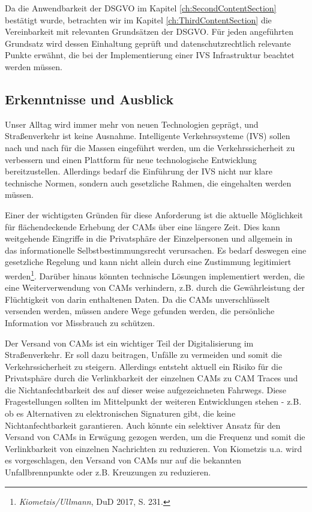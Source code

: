 Da die Anwendbarkeit der DSGVO im Kapitel \ref{ch:SecondContentSection} bestätigt wurde, betrachten wir im Kapitel \ref{ch:ThirdContentSection} die Vereinbarkeit mit relevanten Grundsätzen der DSGVO. Für jeden angeführten Grundsatz wird dessen Einhaltung geprüft und datenschutzrechtlich relevante Punkte erwähnt, die bei der Implementierung einer IVS Infrastruktur beachtet werden müssen.


\subsection{Erkenntnisse und Ausblick}

Unser Alltag wird immer mehr von neuen Technologien geprägt, und Straßenverkehr ist keine Ausnahme. Intelligente Verkehrssysteme (IVS) sollen nach und nach für die Massen eingeführt werden, um die Verkehrssicherheit zu verbessern und einen Plattform für neue technologische Entwicklung bereitzustellen. Allerdings bedarf die Einführung der IVS nicht nur klare technische Normen, sondern auch gesetzliche Rahmen, die eingehalten werden müssen. 

Einer der wichtigsten Gründen für diese Anforderung ist die aktuelle Möglichkeit für flächendeckende Erhebung der CAMs über eine längere Zeit. Dies kann weitgehende Eingriffe in die Privatsphäre der Einzelpersonen und allgemein in das informationelle Selbstbestimmungsrecht verursachen. Es bedarf deswegen eine gesetzliche Regelung und kann nicht allein durch eine Zustimmung legitimiert werden\footnote{\emph{Kiometzis/Ullmann}, DuD 2017, S. 231.}. Darüber hinaus könnten technische Lösungen implementiert werden, die eine Weiterverwendung von CAMs verhindern, z.B. durch die Gewährleistung der Flüchtigkeit von darin enthaltenen Daten. Da die CAMs unverschlüsselt versenden werden, müssen andere Wege gefunden werden, die persönliche Information vor Missbrauch zu schützen.

Der Versand von CAMs ist ein wichtiger Teil der Digitalisierung im Straßenverkehr. Er soll dazu beitragen, Unfälle zu vermeiden und somit die Verkehrssicherheit zu steigern. Allerdings entsteht aktuell ein Risiko für die Privatsphäre durch die Verlinkbarkeit der einzelnen CAMs zu CAM Traces und die Nichtanfechtbarkeit des auf dieser weise aufgezeichneten Fahrwegs. Diese Fragestellungen sollten im Mittelpunkt der weiteren Entwicklungen stehen - z.B. ob es Alternativen zu elektronischen Signaturen gibt, die keine Nichtanfechtbarkeit garantieren. Auch könnte ein selektiver Ansatz für den Versand von CAMs in Erwägung gezogen werden, um die Frequenz und somit die Verlinkbarkeit von einzelnen Nachrichten zu reduzieren. Von Kiometzis u.a. wird es vorgeschlagen, den Versand von CAMs nur auf die bekannten Unfallbrennpunkte oder z.B. Kreuzungen zu reduzieren.

